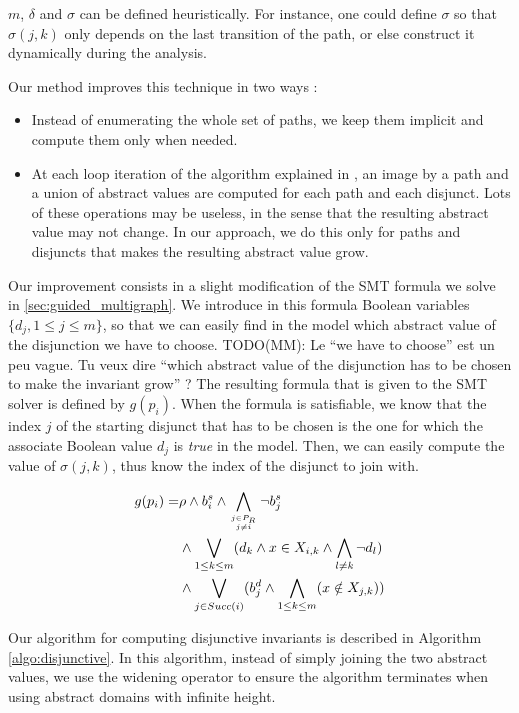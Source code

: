 \documentclass[preprint]{sigplanconf}
\newcommand{\MM}[1]{{\color{blue} TODO(MM): #1}}
\begin{document}
$m$, $\delta$ and $\sigma$ can be defined heuristically.
For instance, one could define $\sigma$ so that $\sigma(j,k)$ only depends on the
last transition of the path, or else construct it dynamically during the
analysis.

Our method improves this technique in two ways :
\begin{itemize}
\item Instead of enumerating the whole set of paths, we keep them implicit and
compute them only when needed.
\item At each loop iteration of the algorithm explained in
\cite{DBLP:conf/pldi/GulwaniZ10}, an image by a path and a union of abstract
values are computed for each path and each disjunct. 
Lots of these operations may be useless, in the sense that the resulting
abstract value may not change.
In our approach, we do this only for paths and disjuncts that makes the
resulting abstract value grow.
\end{itemize}

Our improvement consists in a slight modification of the SMT formula we solve in
\ref{sec:guided_multigraph}.
We introduce in this formula Boolean variables $\{d_j, 1 \leq j \leq m\}$, so
that we can easily find in the model which abstract value of the disjunction we
have to choose.
\MM{Le ``we have to choose'' est un peu vague. Tu veux dire ``which
  abstract value of the disjunction has to be chosen to make the
  invariant grow'' ?}
The resulting formula that is given to the SMT solver is defined
by $g(p_i)$.
When the formula is satisfiable, we know that the index $j$ of the starting
disjunct that has to be chosen is the one for which the associate Boolean value
$d_j$ is \emph{true} in the model. Then, we can easily compute the value of 
$\sigma(j,k)$, thus know the index of the disjunct to join with.

\begin{eqnarray*}
g(p_i) = & \rho \wedge b_i^s \wedge 
\displaystyle\bigwedge_{j \in P_R \atop j \neq i} \neg b_j^s  \\
 & \wedge 
\displaystyle\bigvee_{1 \leq k \leq m} (d_k \wedge x \in X_{i,k} \wedge \bigwedge_{l \neq k}
\neg d_l) \\
 & \wedge
\displaystyle\bigvee_{j \in Succ(i)} 
(b_j^d \wedge \bigwedge_{1 \leq k \leq m} (x \notin X_{j,k}))
\end{eqnarray*}

Our algorithm for computing disjunctive invariants is described in Algorithm
\ref{algo:disjunctive}. In this algorithm, instead of simply joining the two
abstract values, we use the widening operator to ensure the algorithm terminates
when using abstract domains with infinite height.
\end{document}
